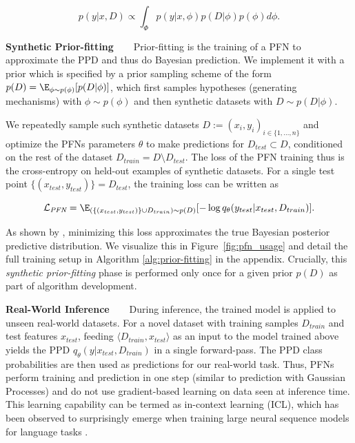 \begin{equation}
    p(y|x,D) \propto \int_{\Phi} p(y|x,\phi) p(D|\phi) p(\phi) d\phi.
    \label{eq:ppd}
\end{equation}

\textbf{Synthetic Prior-fitting~~~} Prior-fitting is the training of a PFN to approximate the PPD and thus do Bayesian prediction. We implement it with a prior which is specified by a prior sampling scheme of the form $p(D)=\E_{\phi \sim p(\phi)}[p(D|\phi)]$, which first samples hypotheses (generating mechanisms) with $\phi \sim p(\phi)$ and then synthetic datasets with $D \sim p(D|\phi)$.

We repeatedly sample such synthetic datasets $D:={(x_i, y_i)}_{i \in \{1,\dots,n\}}$ and optimize the PFN\textquotesingle{}s parameters $\theta$ to make predictions for $D_{test} \subset D$, conditioned on the rest of the dataset $D_{train} = D \setminus D_{test}$. The loss of the PFN training thus is the cross-entropy on held-out examples of synthetic datasets. For a single test point $\{(x_{test},y_{test})\} = D_{test}$, the training loss can be written as

\begin{equation}
    \mathcal{L}_{\textit{PFN}} = \E_{(\{(x_{test}, y_{test})\} \cup D_{train}) \sim p(D)} [-\log q_{\theta}(y_{test}|x_{test},D_{train})].
    \label{eq:lpfn}
\end{equation}

As shown by \cite{muller-iclr22a}, minimizing this loss approximates the true Bayesian posterior predictive distribution. We visualize this in Figure~\ref{fig:pfn_usage} and detail the full training setup in Algorithm \ref{alg:prior-fitting} in the appendix. Crucially, this \textit{synthetic prior-fitting} phase is performed only once for a given prior $p(D)$ as part of algorithm development. 

\textbf{Real-World Inference~~~} During inference, the trained model is applied to unseen real-world datasets. For a novel dataset with training samples $D_{train}$ and test features $x_{test}$, feeding $\langle{}D_{train},x_{test}\rangle$ as an input to the model trained above yields the PPD 
$q_{\theta}(y|x_{test},D_{train})$ in a single forward-pass. The PPD class probabilities are then used as predictions for our real-world task. Thus, PFNs perform training and prediction in one step (similar to prediction with Gaussian Processes) and do not use gradient-based learning on data seen at inference time.  This learning capability can be termed as in-context learning (ICL), which has been observed to surprisingly emerge when training large neural sequence models for language tasks \citep{NEURIPS2020_1457c0d6}.

